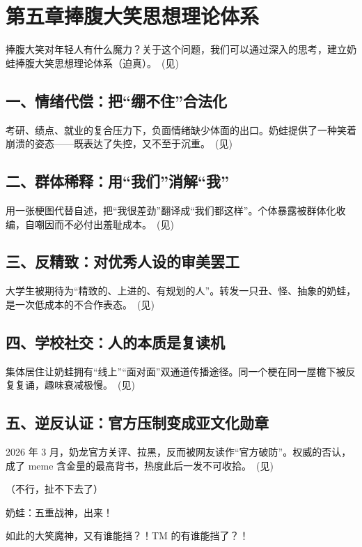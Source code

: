 
\clearpage
\section{第五章\quad 捧腹大笑思想理论体系}

捧腹大笑对年轻人有什么魔力？关于这个问题，我们可以通过深入的思考，建立奶蛙捧腹大笑思想理论体系（迫真）。~(见)



\subsection{一、情绪代偿：把“绷不住”合法化}

考研、绩点、就业的复合压力下，负面情绪缺少体面的出口。奶蛙提供了一种\textquotedbl{}笑着崩溃\textquotedbl{}的姿态——既表达了失控，又不至于沉重。~(见)



\subsection{二、群体稀释：用“我们”消解“我”}

用一张梗图代替自述，把“我很差劲”翻译成“我们都这样”。个体暴露被群体化收编，自嘲因而不必付出羞耻成本。~(见)



\clearpage
\subsection{三、反精致：对优秀人设的审美罢工}

大学生被期待为“精致的、上进的、有规划的人”。转发一只丑、怪、抽象的奶蛙，是一次低成本的不合作表态。~(见)



\subsection{四、学校社交：人的本质是复读机}

集体居住让奶蛙拥有“线上”“面对面”双通道传播途径。同一个梗在同一屋檐下被反复复诵，趣味衰减极慢。~(见)



\subsection{五、逆反认证：官方压制变成亚文化勋章}

2026 年 3 月，奶龙官方关评、拉黑，反而被网友读作“官方破防”。权威的否认，成了 meme 含金量的最高背书，热度此后一发不可收拾。~(见)



（不行，扯不下去了）

奶蛙：五重战神，出来！

如此的大笑魔神，又有谁能挡？！TM 的有谁能挡了？！

